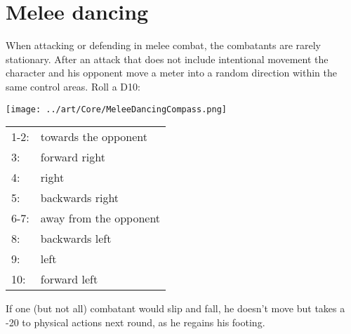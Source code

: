\section{Melee dancing}
When attacking or defending in melee combat,
	the combatants are rarely stationary.
After an attack that does not include intentional movement the character
and his opponent move a meter into a random direction within the same control areas.
Roll a D10:
\par
\begin{exampleblock}
\begin{multicols}{2}
\texttt{[image: ../art/Core/MeleeDancingCompass.png]}
\columnbreak
\begin{tabular}{ll}
	1-2: & towards the opponent\\
	3:   & forward right\\
	4:   & right\\
	5:   & backwards right\\
	6-7: & away from the opponent\\
	8:   & backwards left\\
	9:   & left\\
	10:  & forward left
\end{tabular}
\end{multicols}
\end{exampleblock}
If one (but not all) combatant would slip and fall,
	he doesn’t move but takes a -20 to physical actions next round,
	as he regains his footing.
